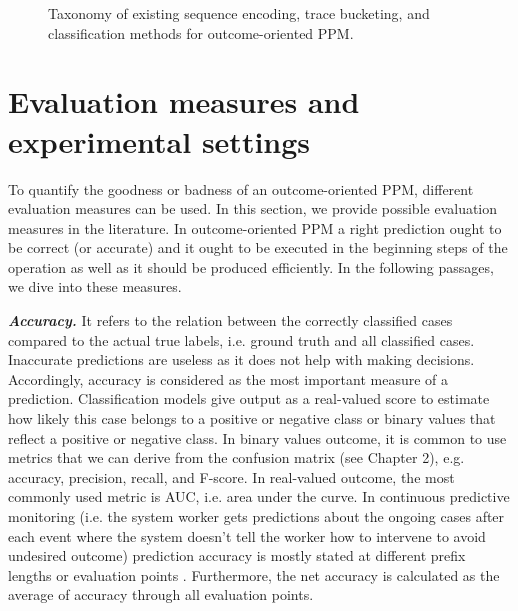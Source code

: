 \begin{figure}[htb]
	\begin{center}
		\caption[Taxonomy of methods for outcome-oriented PPM]{Taxonomy of existing sequence encoding, trace bucketing, and classification methods for outcome-oriented PPM.}
		\label{fig:bucenc}
	\end{center}
\end{figure}



\section{Evaluation measures and experimental settings} \label{sec32}
To quantify the goodness or badness of an outcome-oriented PPM, different evaluation measures can be used. In this section, we provide possible evaluation measures in the literature. In outcome-oriented PPM a right prediction ought to be correct (or accurate) and it ought to be executed in the beginning steps of the operation as well as it should be produced efficiently. In the following passages, we dive into these measures.


\textbf{\textit{Accuracy.}} It refers to the relation between the correctly classified cases compared to the actual true labels, i.e. ground truth and all classified cases. Inaccurate predictions are useless as it does not help with making decisions. Accordingly, accuracy is considered as the most important measure of a prediction. 
Classification models give output as a real-valued score to estimate how likely this case belongs to a positive or negative class or binary values that reflect a positive or negative class. In binary values outcome, it is common to use metrics that we can derive from the confusion matrix (see Chapter 2), e.g. accuracy, precision, recall, and F-score. In real-valued outcome, the most commonly used metric is AUC, i.e. area under the curve. In continuous predictive monitoring (i.e. the system worker gets predictions about the ongoing cases after each event where the system doesn't tell the worker how to intervene to avoid undesired outcome) prediction accuracy is mostly stated at different prefix lengths or evaluation points \cite{verenich2016complex, van2012process, leontjeva2016complex}. Furthermore, the net accuracy is calculated as the average of accuracy through all evaluation points.

